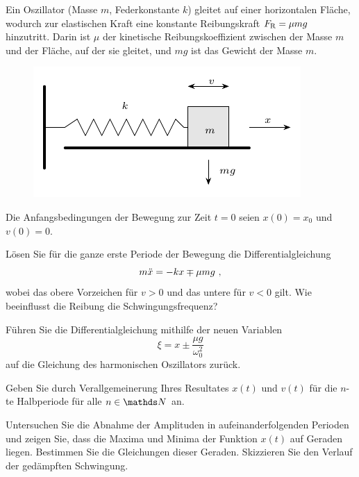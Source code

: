 \begin{atiTask}[
  title = Oszillator auf rauer Unterlage
]
  Ein Oszillator (Masse $m$, Federkonstante $k$) gleitet auf einer horizontalen Fläche, wodurch zur elastischen Kraft eine konstante Reibungskraft $F_{\mathrm{R}} = \mu mg$ hinzutritt.
  Darin ist $\mu$ der kinetische Reibungskoeffizient zwischen der Masse $m$ und der Fläche, auf der sie gleitet, und $mg$ ist das Gewicht der Masse $m$.
  \begin{figure}[H]
    \center
    \includegraphics{task-oszillator_auf_rauer_unterlage-sketch.pdf}
  \end{figure}
  Die Anfangsbedingungen der Bewegung zur Zeit $t=0$ seien $x(0)=x_0$ und $v(0)=0$.
  \begin{atiSubtasks}
    \item{
      Lösen Sie für die ganze erste Periode der Bewegung die Differentialgleichung
      \[
        m \ddot{x} = -kx \mp \mu mg\ ,
      \]
      wobei das obere Vorzeichen für $v>0$ und das untere für $v<0$ gilt.
      Wie beeinflusst die Reibung die Schwingungsfrequenz?

      \begin{atiNote}
        Führen Sie die Differentialgleichung mithilfe der neuen Variablen
        \[
          \xi = x\pm \frac{\mu g}{\omega_0^2}
        \]
        auf die Gleichung des harmonischen Oszillators zurück.
      \end{atiNote}
    }
    \item{
      Geben Sie durch Verallgemeinerung Ihres Resultates $x(t)$ und $v(t)$ für die $n$-te Halbperiode für alle $n\in\setN$ an.
    }
    \item{
      Untersuchen Sie die Abnahme der Amplituden in aufeinanderfolgenden Perioden und zeigen Sie, dass die Maxima und Minima der Funktion $x(t)$ auf Geraden liegen.
      Bestimmen Sie die Gleichungen dieser Geraden.
      Skizzieren Sie den Verlauf der gedämpften Schwingung.
    }
  \end{atiSubtasks}
\end{atiTask}